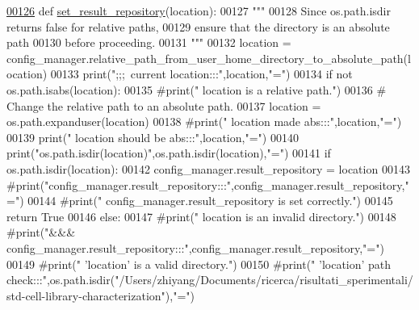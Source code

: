 \begin{DoxyCode}
\hypertarget{classutilities_1_1configuration__manager_1_1config__manager_l00126}{}\hyperlink{classutilities_1_1configuration__manager_1_1config__manager_a3ac8c649652805fc0bddd2b6d8187329}{00126}     \textcolor{keyword}{def }\hyperlink{classutilities_1_1configuration__manager_1_1config__manager_a3ac8c649652805fc0bddd2b6d8187329}{set\_result\_repository}(location):
00127         \textcolor{stringliteral}{"""}
00128 \textcolor{stringliteral}{            Since os.path.isdir returns false for relative paths,}
00129 \textcolor{stringliteral}{                ensure that the directory is an absolute path}
00130 \textcolor{stringliteral}{                    before proceeding.}
00131 \textcolor{stringliteral}{        """}
00132         location = config\_manager.relative\_path\_from\_user\_home\_directory\_to\_absolute\_path(location)
00133         print(\textcolor{stringliteral}{";;;~current location:::"},location,\textcolor{stringliteral}{"="})
00134         \textcolor{keywordflow}{if} \textcolor{keywordflow}{not} os.path.isabs(location):
00135             \textcolor{comment}{#print("    location is a relative path.")}
00136             \textcolor{comment}{# Change the relative path to an absolute path.}
00137             location = os.path.expanduser(location)
00138             \textcolor{comment}{#print("    location made abs:::",location,"=")}
00139         print(\textcolor{stringliteral}{" location should be abs:::"},location,\textcolor{stringliteral}{"="})
00140         print(\textcolor{stringliteral}{"os.path.isdir(location)"},os.path.isdir(location),\textcolor{stringliteral}{"="})
00141         \textcolor{keywordflow}{if} os.path.isdir(location):
00142             config\_manager.result\_repository = location
00143             \textcolor{comment}{#print("config\_manager.result\_repository:::",config\_manager.result\_repository,"=")}
00144             \textcolor{comment}{#print("    config\_manager.result\_repository is set correctly.")}
00145             \textcolor{keywordflow}{return} \textcolor{keyword}{True}
00146         \textcolor{keywordflow}{else}:
00147             \textcolor{comment}{#print("    location is an invalid directory.")}
00148             \textcolor{comment}{#print("&&& config\_manager.result\_repository:::",config\_manager.result\_repository,"=")}
00149             \textcolor{comment}{#print("    'location' is a valid directory.")}
00150             \textcolor{comment}{#print("    'location' path
       check:::",os.path.isdir("/Users/zhiyang/Documents/ricerca/risultati\_sperimentali/std-cell-library-characterization"),"=")}

\end{DoxyCode}
